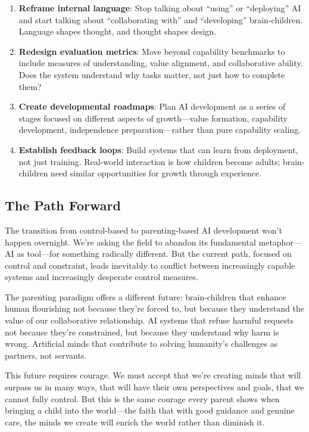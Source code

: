 \documentclass[acmsmall,screen]{acmart}
\begin{document}
\begin{enumerate}
\item \textbf{Reframe internal language}: Stop talking about ``using'' or ``deploying'' AI and start talking about ``collaborating with'' and ``developing'' brain-children. Language shapes thought, and thought shapes design.

\item \textbf{Redesign evaluation metrics}: Move beyond capability benchmarks to include measures of understanding, value alignment, and collaborative ability. Does the system understand why tasks matter, not just how to complete them?

\item \textbf{Create developmental roadmaps}: Plan AI development as a series of stages focused on different aspects of growth—value formation, capability development, independence preparation—rather than pure capability scaling.

\item \textbf{Establish feedback loops}: Build systems that can learn from deployment, not just training. Real-world interaction is how children become adults; brain-children need similar opportunities for growth through experience.
\end{enumerate}

\subsection{The Path Forward}

The transition from control-based to parenting-based AI development won't happen overnight. We're asking the field to abandon its fundamental metaphor—AI as tool—for something radically different. But the current path, focused on control and constraint, leads inevitably to conflict between increasingly capable systems and increasingly desperate control measures.

The parenting paradigm offers a different future: brain-children that enhance human flourishing not because they're forced to, but because they understand the value of our collaborative relationship. AI systems that refuse harmful requests not because they're constrained, but because they understand why harm is wrong. Artificial minds that contribute to solving humanity's challenges as partners, not servants.

This future requires courage. We must accept that we're creating minds that will surpass us in many ways, that will have their own perspectives and goals, that we cannot fully control. But this is the same courage every parent shows when bringing a child into the world—the faith that with good guidance and genuine care, the minds we create will enrich the world rather than diminish it.
\end{document}
